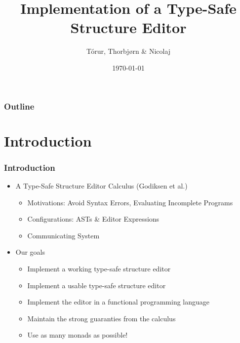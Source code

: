 \documentclass{beamer}
\title{Implementation of a Type-Safe Structure Editor}
\author{Tórur, Thorbjørn \& Nicolaj}
\institute{University of Copenhagen}
\date{\today}
\begin{document}


\begin{frame}
    \titlepage
\end{frame}

\begin{frame}
    \frametitle{Outline}
    \tableofcontents
\end{frame}

\section{Introduction}

\begin{frame}
    \frametitle{Introduction}

    \begin{itemize}

        \item A Type-Safe Structure Editor Calculus (Godiksen et al.)
        \begin{itemize}
            \item Motivations: Avoid Syntax Errors, Evaluating Incomplete
                Programs
                \pause
            \item Configurations: ASTs \& Editor Expressions
                \pause
            \item Communicating System
                \pause
        \end{itemize}

        \item Our goals
        \begin{itemize}
            \item Implement a working type-safe structure editor
                \pause
            \item Implement a usable type-safe structure editor
                \pause
            \item Implement the editor in a functional programming language
                \pause
            \item Maintain the strong guaranties from the calculus
                \pause
            \item Use as many monads as possible!
        \end{itemize}

    \end{itemize}
\end{frame}
\end{document}
